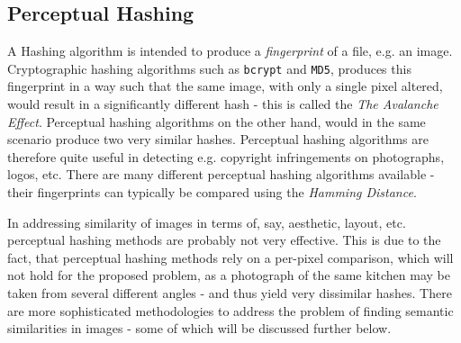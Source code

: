 \subsection{Perceptual Hashing}
A Hashing algorithm is intended to produce a \textit{fingerprint} of a file, e.g. an image. 
Cryptographic hashing algorithms such as \texttt{bcrypt} and \texttt{MD5}, produces this fingerprint in a way such that the same image, with only a single pixel altered, would result in a significantly different hash - this is called the \textit{The Avalanche Effect}.
Perceptual hashing algorithms on the other hand, would in the same scenario produce two very similar hashes. 
Perceptual hashing algorithms are therefore quite useful in detecting e.g. copyright infringements on photographs, logos, etc. 
There are many different perceptual hashing algorithms available - their fingerprints can typically be compared using the \textit{Hamming Distance}. 

In addressing similarity of images in terms of, say, aesthetic, layout, etc. perceptual hashing methods are probably not very effective.
This is due to the fact, that perceptual hashing methods rely on a per-pixel comparison, which will not hold for the proposed problem, as a photograph of the same kitchen may be taken from several different angles - and thus yield very dissimilar hashes. 
There are more sophisticated methodologies to address the problem of finding semantic similarities in images - some of which will be discussed further below. 